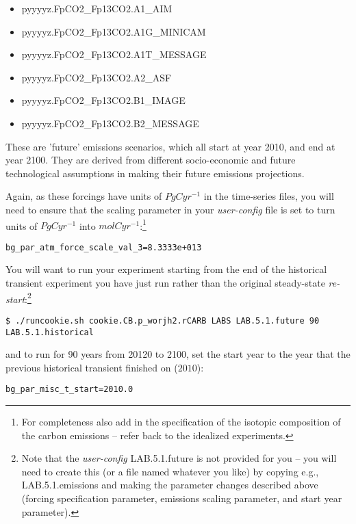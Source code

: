 \vspace{1mm}
\begin{itemize}[noitemsep]
\item \textsf{\footnotesize pyyyyz.FpCO2\_Fp13CO2.A1\_AIM}
\item \textsf{\footnotesize pyyyyz.FpCO2\_Fp13CO2.A1G\_MINICAM}
\item \textsf{\footnotesize pyyyyz.FpCO2\_Fp13CO2.A1T\_MESSAGE}
\item \textsf{\footnotesize pyyyyz.FpCO2\_Fp13CO2.A2\_ASF}
\item \textsf{\footnotesize pyyyyz.FpCO2\_Fp13CO2.B1\_IMAGE}
\item \textsf{\footnotesize pyyyyz.FpCO2\_Fp13CO2.B2\_MESSAGE}
\end{itemize}
\vspace{1mm}

These are 'future' emissions scenarios, which all start at year 2010, and end at year 2100. They are derived from different socio-economic and future technological assumptions in making their future emissions projections.

\vspace{1mm}

Again, as these forcings have units of \(PgCyr^{-1}\) in the time-series files, you will need to ensure that the scaling parameter in your \textit{user-config} file is set to turn units of \(PgCyr^{-1}\) into \(mol C yr^{-1}\):\footnote{For completeness also add in the specification of the isotopic composition of the carbon emissions -- refer back to the idealized experiments.}
\vspace{-2pt}\small\begin{verbatim}
bg_par_atm_force_scale_val_3=8.3333e+013
\end{verbatim}\normalsize\vspace{-2pt}

You will want to run your experiment starting from the end of the historical transient experiment you have just run rather than the original steady-state \textit{re-start}:\footnote{Note that the \textit{user-config} \textsf{\footnotesize LAB.5.1.future } is not provided for you – you will need to create this (or a file named whatever you like) by copying e.g., \textsf{\footnotesize LAB.5.1.emissions} and making the parameter changes described above (forcing specification parameter, emissions scaling parameter, and start year parameter).}
\vspace{-2pt}\small\begin{verbatim}
$ ./runcookie.sh cookie.CB.p_worjh2.rCARB LABS LAB.5.1.future 90 LAB.5.1.historical
\end{verbatim}\normalsize\vspace{-2pt}
and to run for 90 years from 20120 to 2100, set the start year to the year that the previous historical transient finished on (\(2010\)):
\vspace{-2pt}\small\begin{verbatim}
bg_par_misc_t_start=2010.0
\end{verbatim}\normalsize\vspace{-2pt}

